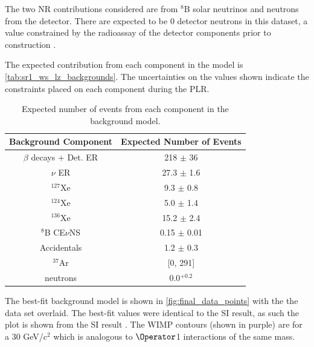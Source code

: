 \par
The two NR contributions considered are from ${}^{8}$B solar neutrinos and neutrons from the detector.
There are expected to be 0 detector neutrons in this dataset, a value constrained by the radioassay of the detector components prior to construction \cite{LZ_assay_ref}.

\par
The expected contribution from each component in the model is \autoref{tab:sr1_ws_lz_backgrounds}.
The uncertainties on the values shown indicate the constraints placed on each component during the PLR.

\begin{table}[]
    \centering
    \begin{tabular}{c|c}
        Background Component     & Expected Number of Events  \\ \hline
        $\beta$ decays + Det. ER & 218 $\pm$ 36 \\
        $\nu$ ER                 & 27.3 $\pm$ 1.6 \\
        ${}^{127}$Xe             & 9.3 $\pm$ 0.8 \\
        ${}^{124}$Xe             & 5.0 $\pm$ 1.4 \\
        ${}^{136}$Xe             & 15.2 $\pm$ 2.4 \\
        ${}^{8}$B CE$\nu$NS      & 0.15 $\pm$ 0.01 \\
        Accidentals              & 1.2 $\pm$ 0.3 \\
        ${}^{37}$Ar              & [0, 291]      \\
        neutrons                 & 0.0${}^{+0.2}$
    \end{tabular}
    \caption{Expected number of events from each component in the background model.}
    \label{tab:sr1_ws_lz_backgrounds}
\end{table}

\par
The best-fit background model is shown in \autoref{fig:final_data_points} with the the data set overlaid.
The best-fit values were identical to the SI result, as such the plot is shown from the SI result \cite{lz_ws_sr1_ref}.
The WIMP contours (shown in purple) are for a 30 GeV/c${^2}$ which is analogous to $\Operator$1 interactions of the same mass.

